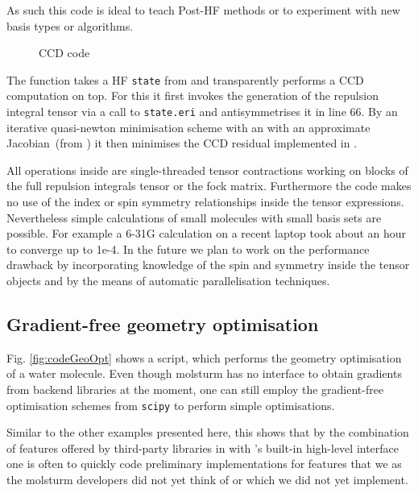 As such this code is ideal to teach Post-HF methods
or to experiment with new basis types or algorithms.

\begin{figure}
	
	\caption{CCD code}
	\label{fig:codeCCD}
\end{figure}


The  function takes a HF \texttt{state} from \molsturm and transparently
performs a CCD computation on top.
For this it first invokes the generation of the repulsion integral tensor
via a call to \texttt{state.eri} and antisymmetrises it in line 66.
By an iterative quasi-newton minimisation scheme with an
with an approximate Jacobian~(from )
it then minimises the CCD residual implemented in .

All operations inside  are single-threaded tensor contractions
working on blocks of the full repulsion integrals tensor or the fock matrix.
Furthermore the code makes no use of the index or spin symmetry relationships
inside the tensor expressions.
Nevertheless simple calculations of small molecules with small basis sets are possible.
For example a  6-31G calculation on a recent laptop took
about an hour to converge up to 1e-4.
In the future we plan to work on the performance drawback by incorporating
knowledge of the spin and symmetry inside the tensor objects
and by the means of automatic parallelisation techniques.

\subsection{Gradient-free geometry optimisation}
\label{sec:ex:geo}
Fig. \ref{fig:codeGeoOpt} shows a \python script,
which performs the geometry optimisation of a water molecule.
Even though molsturm has no interface to obtain gradients
from backend libraries at the moment,
one can still employ the gradient-free optimisation schemes from \texttt{scipy}
to perform simple optimisations.

Similar to the other examples presented here,
this shows that by the combination of features offered by third-party
libraries in \python with \molsturm's built-in high-level interface
one is often to quickly code preliminary implementations
for features that we as the molsturm developers did not yet think of
or which we did not yet implement.

